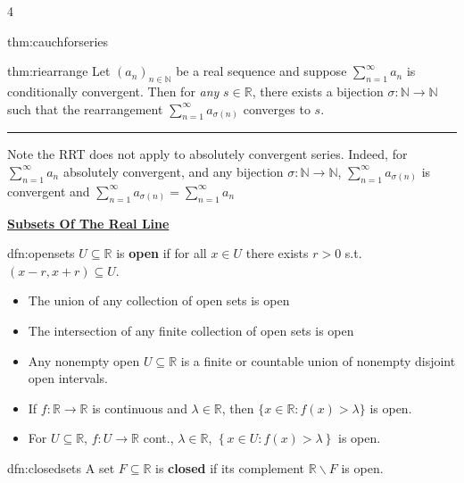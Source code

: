 \documentclass[landscape, 8pt]{extarticle}
\begin{document}
\begin{multicols*}{4}
\begin{mthm}{thm:cauchforseries}{ }
		\end{mthm}
		
		
		\begin{thm}{thm:riearrange}{ }
			Let $(a_n)_{n \in \mathbb{N}}$ be a real sequence and suppose $\sum_{n=1}^{\infty}a_n$ is conditionally convergent. Then for \textit{any} $s \in \mathbb{R}$, there exists a bijection $\sigma: \mathbb{N} \to \mathbb{N}$ such that the rearrangement $\sum_{n=1}^{\infty}a_{\sigma(n)}$ converges to $s$. 
			\vspace{1pt}
			\hrule
			\vspace{2pt}
			Note the RRT does not apply to absolutely convergent series. Indeed, for $\sum_{n=1}^{\infty}a_n$ absolutely convergent, and any bijection $\sigma: \mathbb{N} \to \mathbb{N}$, $\sum_{n=1}^{\infty}a_{\sigma(n)}$ is convergent and $\sum_{n=1}^{\infty}a_{\sigma(n)} = \sum_{n=1}^{\infty}a_n$
			
		\end{thm}
		
		
		
	{\tiny \textbf{\underline{Subsets Of The Real Line}}}
		
		
		
		\begin{dfn}{dfn:opensets}{ }
			$U \subseteq \mathbb{R}$ is \textbf{open} if for all $x \in U$ there exists $r > 0$ s.t. $(x-r, x+r) \subseteq U$.
			
			\begin{itemize}
				\item The union of any collection of open sets is open
				\item The intersection of any finite collection of open sets is open
				\item Any nonempty open $U \subseteq \mathbb{R}$ is a finite or countable union of nonempty disjoint open intervals.
				\item If $f: \mathbb{R} \to \mathbb{R}$ is continuous and $\lambda \in \mathbb{R}$, then $\{x \in \mathbb{R} : f(x) > \lambda\}$ is open.
				\item For $U \subseteq\mathbb{R}$, $f: U \to \mathbb{R}$ cont., $\lambda\in \mathbb{R}$, $\left\{x\in U : f(x) > \lambda\right\}$ is open.
			\end{itemize}
			
		\end{dfn}
		
		
		\begin{dfn}{dfn:closedsets}{ }
			A set $F \subseteq \mathbb{R}$ is \textbf{closed} if its complement $\mathbb{R} \backslash F$ is open.
			

\end{dfn}
\end{multicols*}
\end{document}
